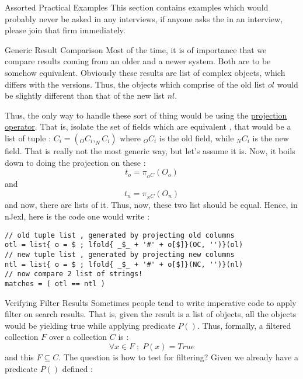 \begin{section}{Assorted Practical Examples}
This section contains examples which would probably never be asked in any interviews,
if anyone asks the in an interview, please join that firm immediately.

\begin{subsection}{Generic Result Comparison}
Most of the time, it is of importance that we compare results coming from an 
older and a newer system. Both are to be somehow equivalent.
Obviously these results are list of complex objects, which differs with the versions.
Thus, the objects which comprise of the old list $ol$ would be slightly different 
than that of the new list $nl$. 

Thus, the only way to handle these sort of thing would be using the 
\href{https://en.wikipedia.org/wiki/Projection\_(relational\_algebra)}{projection operator}.
That is, isolate the set of fields which are equivalent , that would be a list of tuple :
$C_i = ( _OC_i,_NC_i )$ where $_OC_i$ is the old field, while $_NC_i$ is the new field.
That is really not the most generic way, but let's assume it is.
Now, it boils down to doing the projection on these :
$$
t_o = \pi_{ _OC }(O_o) 
$$ 
and
$$
t_n = \pi_{ _NC }(O_n)
$$ 
and now, there are lists of it. Thus, now, these two list should be equal.
Hence, in nJexl, here is the code one would write :

\begin{center}\begin{minipage}{\linewidth}
\begin{lstlisting}[style=JexlStyle]
// old tuple list , generated by projecting old columns 
otl = list{ o = $ ; lfold{ _$_ + '#' + o[$]}(OC, '')}(ol)
// new tuple list , generated by projecting new columns 
ntl = list{ o = $ ; lfold{ _$_ + '#' + o[$]}(NC, '')}(nl)
// now compare 2 list of strings!
matches = ( otl == ntl )  
\end{lstlisting}  
\end{minipage}\end{center}
\end{subsection}

\begin{subsection}{Verifying Filter Results}
Sometimes people tend to write imperative code to apply filter on search results.
That is, given the result is a list of objects, all the objects would be yielding true
while applying predicate $P()$. Thus, formally, a filtered collection $F$ over a collection $C$ is :
$$
\forall x \in F \; ; \; P(x)  = True 
$$
and this $F \subseteq C$. The question is how to test for filtering?
Given we already have a predicate $P()$ defined :
 

\end{subsection}
\end{section}
